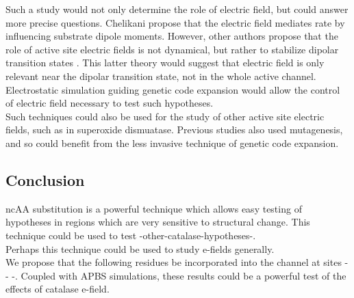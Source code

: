 \documentclass[9pt,twocolumn,twoside]{pnas-new}
\begin{document}
Such a study would not only determine the role of electric field, but could answer more precise questions. Chelikani propose that the electric field mediates rate by influencing substrate dipole moments. However, other authors propose that the role of active site electric fields is not dynamical, but rather to stabilize dipolar transition states \cite{asdipolestabilization}. This latter theory would suggest that electric field is only relevant near the dipolar transition state, not in the whole active channel. Electrostatic simulation guiding genetic code expansion would allow the control of electric field necessary to test such hypotheses.\\

Such techniques could also be used for the study of other active site electric fields, such as in superoxide dismuatase. Previous studies \cite{concentrated-as-efield-sod} also used mutagenesis, and so could benefit from the less invasive technique of genetic code expansion.\\

\subsection*{Conclusion}

ncAA substitution is a powerful technique which allows easy testing of hypotheses in regions which are very sensitive to structural change. This technique could be used to test -other-catalase-hypotheses-.\\

Perhaps this technique could be used to study e-fields generally.\\

We propose that the following residues be incorporated into the channel at sites - - -. Coupled with APBS simulations, these results could be a powerful test of the effects of catalase e-field.\\
\end{document}
